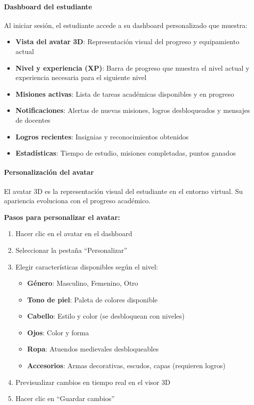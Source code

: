 \paragraph{Dashboard del estudiante}

Al iniciar sesión, el estudiante accede a su dashboard personalizado que muestra:

\begin{itemize}
	\item \textbf{Vista del avatar 3D}: Representación visual del progreso y equipamiento actual
	\item \textbf{Nivel y experiencia (XP)}: Barra de progreso que muestra el nivel actual y experiencia necesaria para el siguiente nivel
	\item \textbf{Misiones activas}: Lista de tareas académicas disponibles y en progreso
	\item \textbf{Notificaciones}: Alertas de nuevas misiones, logros desbloqueados y mensajes de docentes
	\item \textbf{Logros recientes}: Insignias y reconocimientos obtenidos
	\item \textbf{Estadísticas}: Tiempo de estudio, misiones completadas, puntos ganados
\end{itemize}

\paragraph{Personalización del avatar}

El avatar 3D es la representación visual del estudiante en el entorno virtual. Su apariencia evoluciona con el progreso académico.

\textbf{Pasos para personalizar el avatar:}

\begin{enumerate}
	\item Hacer clic en el avatar en el dashboard
	\item Seleccionar la pestaña ``Personalizar''
	\item Elegir características disponibles según el nivel:
	\begin{itemize}
		\item \textbf{Género}: Masculino, Femenino, Otro
		\item \textbf{Tono de piel}: Paleta de colores disponible
		\item \textbf{Cabello}: Estilo y color (se desbloquean con niveles)
		\item \textbf{Ojos}: Color y forma
		\item \textbf{Ropa}: Atuendos medievales desbloqueables
		\item \textbf{Accesorios}: Armas decorativas, escudos, capas (requieren logros)
	\end{itemize}
	\item Previsualizar cambios en tiempo real en el visor 3D
	\item Hacer clic en ``Guardar cambios''
\end{enumerate}

